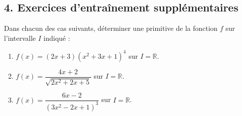 \documentclass[12pt,a4paper]{article}
\begin{document}
\vspace{0.3cm}


\subsection*{\color{myred}4. Exercices d'entraînement supplémentaires}

\begin{tcolorbox}[colback=yellow!5!white,colframe=myred,title=\textbf{Exercice d'entraînement}]
Dans chacun des cas suivants, déterminer une primitive de la fonction $f$ sur l'intervalle $I$ indiqué :

\begin{enumerate}
    \item $f(x) = (2x + 3)(x^2 + 3x + 1)^4$ sur $I = \mathbb{R}$.
    \item $f(x) = \dfrac{4x + 2}{\sqrt{2x^2 + 2x + 5}}$ sur $I = \mathbb{R}$.
    \item $f(x) = \dfrac{6x - 2}{(3x^2 - 2x + 1)^3}$ sur $I = \mathbb{R}$.
\end{enumerate}
\end{tcolorbox}

\vspace{0.3cm}
\end{document}
